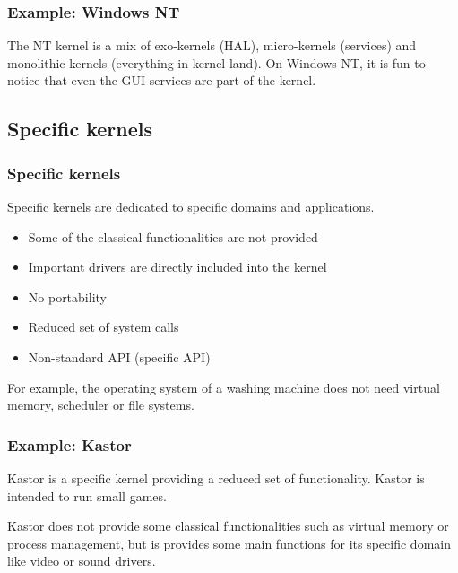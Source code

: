 %
%

\begin{frame}
  \frametitle{Example: Windows NT}

  \begin{center}
  \end{center}

  The NT kernel is a mix of exo-kernels (HAL), micro-kernels (services) and monolithic kernels (everything in kernel-land). On Windows NT, it is fun to notice that even the GUI services are part of the kernel.

\end{frame}

%
%

\subsection{Specific kernels}

%
%

\begin{frame}
  \frametitle{Specific kernels}

  Specific kernels are dedicated to specific domains and applications.

  \begin{itemize}
  \item
    Some of the classical functionalities are not provided
  \item
    Important drivers are directly included into the kernel
  \item
    No portability
  \item
    Reduced set of system calls
  \item
    Non-standard API (specific API)
  \end{itemize}

  \-

  For example, the operating system of a washing machine does not need virtual memory, scheduler or file systems.

\end{frame}

%
%

\begin{frame}
  \frametitle{Example: Kastor}

  Kastor is a specific kernel providing a reduced set of functionality. Kastor is intended to run small games.

  \begin{center}
  \end{center}

  Kastor does not provide some classical functionalities such as virtual memory or process management, but is provides some main functions for its specific domain like video or sound drivers.

\end{frame}

